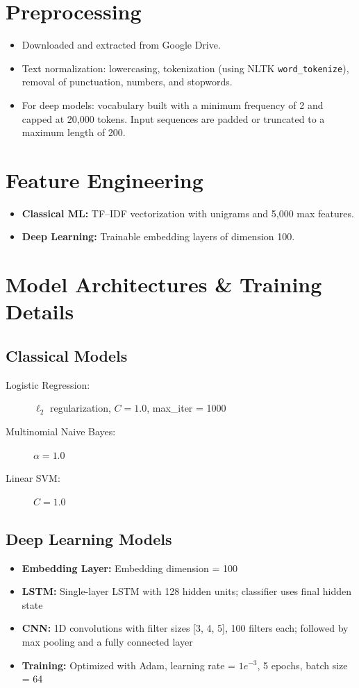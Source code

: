 \documentclass[12pt,a4paper]{article}
\begin{document}
\section{Preprocessing}
\begin{itemize}
  \item Downloaded and extracted from Google Drive.
  \item Text normalization: lowercasing, tokenization (using NLTK \texttt{word\_tokenize}), removal of punctuation, numbers, and stopwords.
  \item For deep models: vocabulary built with a minimum frequency of 2 and capped at 20,000 tokens. Input sequences are padded or truncated to a maximum length of 200.
\end{itemize}

\section{Feature Engineering}
\begin{itemize}
  \item \textbf{Classical ML:} TF–IDF vectorization with unigrams and 5,000 max features.
  \item \textbf{Deep Learning:} Trainable embedding layers of dimension 100.
\end{itemize}

\section{Model Architectures \& Training Details}
\subsection{Classical Models}
\begin{description}
  \item[Logistic Regression:] $\ell_2$ regularization, $C = 1.0$, max\_iter = 1000
  \item[Multinomial Naive Bayes:] $\alpha = 1.0$
  \item[Linear SVM:] $C = 1.0$
\end{description}

\subsection{Deep Learning Models}
\begin{itemize}
  \item \textbf{Embedding Layer:} Embedding dimension = 100
  \item \textbf{LSTM:} Single-layer LSTM with 128 hidden units; classifier uses final hidden state
  \item \textbf{CNN:} 1D convolutions with filter sizes [3, 4, 5], 100 filters each; followed by max pooling and a fully connected layer
  \item \textbf{Training:} Optimized with Adam, learning rate = $1e^{-3}$, 5 epochs, batch size = 64
\end{itemize}
\end{document}
